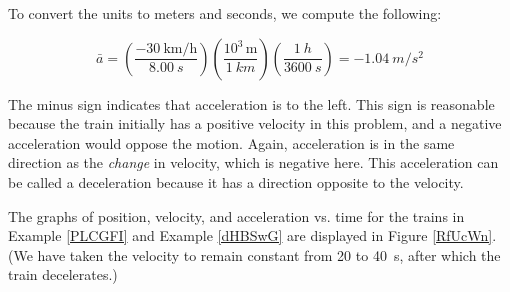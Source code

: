 \documentclass[main-ap-physics.tex]{subfiles}
\begin{document}
To convert the units to meters and seconds, we compute the following:

\begin{equation*}
    \bar{a} = \left(\frac{-\SI[per-mode=fraction]{30}{\kilo\meter\per\hour}}{\SI{8.00}{s}}\right)
        \left(\frac{10^3\,\text{m}}{\SI{1}{km}}\right)\left(\frac{\SI{1}{h}}{\SI{3600}{s}}\right) = -\SI{1.04}{m/s^2}
\end{equation*}

The minus sign indicates that acceleration is to the left. This sign is reasonable because the train initially has a positive velocity in this problem, and a negative acceleration would oppose the motion. Again, acceleration is in the same direction as the \textit{change} in velocity, which is negative here. This acceleration can be called a deceleration because it has a direction opposite to the velocity.

\endsolution   

The graphs of position, velocity, and acceleration vs. time for the trains in Example \ref{PLCGFI} and Example \ref{dHBSwG} are displayed in Figure \ref{RfUcWn}. (We have taken the velocity to remain constant from 20 to \SI{40}{s}, after which the train decelerates.)
\end{document}
